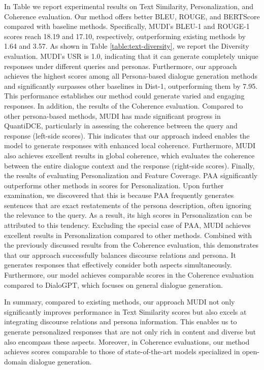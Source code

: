 \documentclass[letterpaper]{article} %
\begin{document}
In Table \label{table:main-results} we report experimental results on Text Similarity, Personalization, and Coherence evaluation. Our method offers better BLEU, ROUGE, and BERTScore compared with baseline methods. Specifically, MUDI's BLEU-1 and ROUGE-1 scores reach 18.19 and 17.10, respectively, outperforming existing methods by 1.64 and 3.57. As shown in Table \ref{table:text-diversity}, we report the Diversity evaluation. MUDI's USR is 1.0, indicating that it can generate completely unique responses under different queries and personas. Furthermore, our approach achieves the highest scores among all Persona-based dialogue generation methods and significantly surpasses other baselines in Dist-1, outperforming them by 7.95. This performance establishes our method could generate varied and engaging responses. In addition, the results of the Coherence evaluation. Compared to other persona-based methods, MUDI has made significant progress in QuantiDCE, particularly in assessing the coherence between the query and response (left-side scores). This indicates that our approach indeed enables the model to generate responses with enhanced local coherence. Furthermore, MUDI also achieves excellent results in global coherence, which evaluates the coherence between the entire dialogue context and the response (right-side scores). Finally, the results of evaluating Personalization and Feature Coverage. PAA significantly outperforms other methods in scores for Personalization. Upon further examination, we discovered that this is because PAA frequently generates sentences that are exact restatements of the persona description, often ignoring the relevance to the query. As a result, its high scores in Personalization can be attributed to this tendency. Excluding the special case of PAA, MUDI achieves excellent results in Personalization compared to other methods. Combined with the previously discussed results from the Coherence evaluation, this demonstrates that our approach successfully balances discourse relations and persona. It generates responses that effectively consider both aspects simultaneously. Furthermore, our model achieves comparable scores in the Coherence evaluation compared to DialoGPT, which focuses on general dialogue generation.

In summary, compared to existing methods, our approach MUDI not only significantly improves performance in Text Similarity scores but also excels at integrating discourse relations and persona information. This enables us to generate personalized responses that are not only rich in content and diverse but also encompass these aspects. Moreover, in Coherence evaluations, our method achieves scores comparable to those of state-of-the-art models specialized in open-domain dialogue generation.
\end{document}

